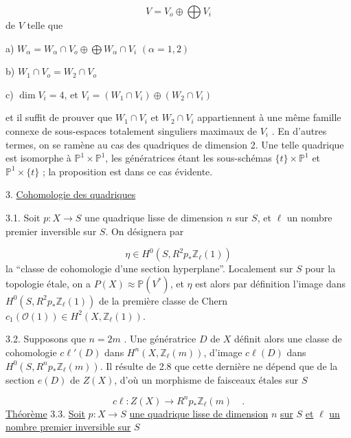 \begin{equation*}
V = V_o \oplus \bigoplus V_i
\end{equation*}
de $V$ telle que

a) \quad $W_\alpha = W_\alpha \cap V_o \oplus \bigoplus W_\alpha \cap V_i$ \qquad $(\alpha = 1,2)$

b) \quad $W_1 \cap V_o = W_2 \cap V_o$

c) \quad $\dim V_i = 4$, et $V_i = (W_1 \cap V_i) \oplus (W_2 \cap V_i)$

et il suffit de prouver que $W_1 \cap V_i$ et $W_2 \cap V_i$ appartiennent à une même famille connexe de sous-espaces totalement singuliers maximaux de $V_i$ . En d'autres termes, on se ramène au cas des quadriques de dimension 2. Une
telle quadrique est isomorphe à $\mathbb{P}^1 \times \mathbb{P}^1$, les génératrices étant les sous-schémas $\{t\} \times \mathbb{P}^1$ et $\mathbb{P}^1 \times \{t\}$ ; la proposition est dans ce cas évidente.


3. \underline{Cohomologie des quadriques}

3.1. Soit $p : X \longrightarrow S$ une quadrique lisse de dimension $n$ sur $S$, et $\ell$ un nombre premier inversible sur $S$. On désignera par

\begin{equation*}
\eta \in H^0(S, R^2 p_* \mathbb{Z}_\ell(1))
\end{equation*}
la ``classe de cohomologie d'une section hyperplane''. Localement sur $S$ pour la topologie étale, on a $P(X) \approx \mathbb{P}(V^*)$, et $\eta$ est alors par définition l'image dans $H^0(S, R^2 p_* \mathbb{Z}_\ell(1))$ de la première classe de Chern $c_1(\mathcal{O}(1)) \in H^2(X, \mathbb{Z}_\ell(1))$.

3.2. Supposons que $n = 2m$ . Une génératrice $D$ de $X$ définit alors une classe de cohomologie $c\ell'(D)$ dans $H^n(X, \mathbb{Z}_\ell(m))$, d'image $c\ell(D)$ dans $H^0(S,R^n p_* \mathbb{Z}_\ell(m))$. Il résulte de 2.8 que cette dernière ne dépend que de la section $e(D)$ de $Z(X)$, d'où un morphisme de faisceaux étales sur $S$

\begin{equation}\tag{3.2.1}
c\ell : Z(X) \longrightarrow R^n p_* \mathbb{Z}_\ell(m) \quad .
\end{equation}
\underline{Théorème} 3.3. \underline{Soit} $p : X \longrightarrow S$ \underline{une quadrique lisse de dimension} $n$ \underline{sur} $S$ \underline{et} $\ell$ \underline{un nombre premier inversible sur} $S$


